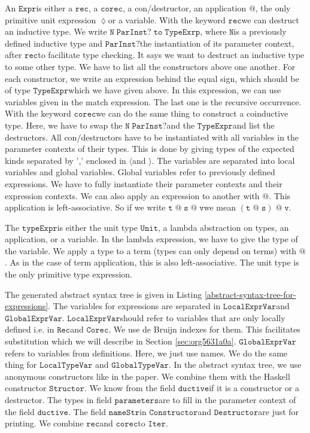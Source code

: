 \documentclass[a4paper,cleardoubleempty,BCOR1cm]{scrbook}
\begin{document}
An $\mathtt{Expr}$\;is either a $\mathtt{rec}$, a $\mathtt{corec}$, a con/destructor, an application
$\mathtt{@}$, the only primitive unit expression $\mathtt{\lozenge}$\;or a variable. With the
keyword $\mathtt{rec}$\;we can destruct an inductive type. We write
$\mathtt{N\;ParInst?\;to\;TypeExrp}$, where $\mathtt{N}$\;is a previously defined inductive type
and $\mathtt{ParInst?}$\;the instantiation of its parameter context, after $\mathtt{rec}$\;to
facilitate type checking. It says we want to destruct an inductive type to
some other type. We have to list all the constructors above one another.
For each constructor, we write an expression behind the equal sign, which
should be of type $\mathtt{TypeExpr}$\;which we have given above. In this expression,
we can use variables given in the match expression. The last one is the
recursive occurrence. With the keyword $\mathtt{corec}$\;we can do the same thing to
construct a coinductive type. Here, we have to swap the $\mathtt{N\;ParInst?}$\;and the
$\mathtt{TypeExpr}$\;and list the destructors. All con/destructors have to be
instantiated with all variables in the parameter contexts of their types.
This is done by giving types of the expected kinds separated by ',' enclosed
in $\mathtt{\langle}$\;and $\mathtt{\rangle}$. The variables are separated into local variables
and global variables. Global variables refer to previously defined
expressions. We have to fully instantiate their parameter contexts and their
expression contexts. We can also apply an expression to another with $\mathtt{@}$.
This application is left-associative.  So if we write $\mathtt{t\;@\;s\;@\;v}$\;we mean
$\mathtt{(t\;@\;s)\;@\;v}$.

The $\mathtt{typeExpr}$\;is either the unit type $\mathtt{Unit}$, a lambda abstraction on
types, an application, or a variable. In the lambda expression, we have to
give the type of the variable. We apply a type to a term (types can only
depend on terms) with $\mathtt{@}$.  As in the case of term application, this is
also left-associative.  The unit type is the only primitive type
expression.

The generated abstract syntax tree is given in Listing
\ref{abstract-syntax-tree-for-expressions}. The variables for expressions are
separated in $\mathtt{LocalExprVar}$\;and $\mathtt{GlobalExprVar}$. $\mathtt{LocalExprVar}$\;should refer
to variables that are only locally defined i.e. in $\mathtt{Rec}$\;and $\mathtt{Corec}$. We
use de Bruijn indexes for them. This facilitates substitution which we will
describe in Section \ref{sec:org5631a0a}. $\mathtt{GlobalExprVar}$\;refers to variables from
definitions. Here, we just use names. We do the same thing for $\mathtt{LocalTypeVar}$
and $\mathtt{GlobalTypeVar}$. In the abstract syntax tree, we use anonymous
constructors like in the paper. We combine them with the Haskell constructor
$\mathtt{Structor}$. We know from the field $\mathtt{ductive}$\;if it is a constructor or a
destructor. The types in field $\mathtt{parameters}$\;are to fill in the parameter
context of the field $\mathtt{ductive}$. The field $\mathtt{nameStr}$\;in $\mathtt{Constructor}$\;and
$\mathtt{Destructor}$\;are just for printing. We combine $\mathtt{rec}$\;and $\mathtt{corec}$\;to $\mathtt{Iter}$.
\end{document}
